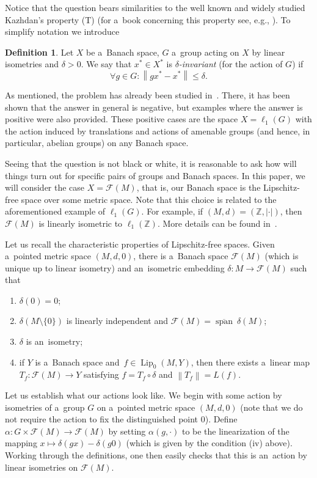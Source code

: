 \documentclass[11pt,a4paper]{amsart}
\theoremstyle{definition}
\newtheorem{definition}[theorem]{Definition}
\newcommand{\Z}{\mathbb{Z}}
\newcommand{\F}{\mathcal{F}}
\newcommand{\lo}{\operatorname{span}}
\newcommand{\abs}[1]{\left| #1 \right|}
\newcommand{\norm}[1]{\left\| #1 \right\|}
\newcommand{\Lipz}{\operatorname{Lip}_0}
\begin{document}
	Notice that the question bears similarities to the well known and widely studied Kazhdan's property (T) (for a~book concerning this property see, e.g., \cite{BHV08}). To simplify notation we introduce
	\begin{definition}
		Let $X$ be a~Banach space, $G$ a~group acting on $X$ by linear isometries and $\delta > 0$. We say that $x^* \in X^*$ is \emph{$\delta$-invariant} (for the action of $G$) if
		\begin{equation*}
			\forall g \in G \colon \norm{gx^* - x^*} \leq \delta.
		\end{equation*}
	\end{definition}
	
	As mentioned, the problem has already been studied in~\cite{Glasner22}. There, it has been shown that the answer in general is negative, but examples where the answer is positive were also provided. These positive cases are the space $X = \ell_1(G)$ with the action induced by translations and actions of amenable groups (and hence, in particular, abelian groups) on any Banach space.
	
	Seeing that the question is not black or white, it is reasonable to ask how will things turn out for specific pairs of groups and Banach spaces. In this paper, we will consider the case $X = \F(M)$, that is, our Banach space is the Lipschitz-free space over some metric space. Note that this choice is related to the aforementioned example of $\ell_1(G)$. For example, if $(M, d) = (\Z, \abs{\cdot})$, then $\F(M)$ is linearly isometric to $\ell_1(\Z)$. More details can be found in~\cite{WeaverLA}.
	
	Let us recall the characteristic properties of Lipschitz-free spaces. Given a~pointed metric space $(M, d, 0)$, there is a~Banach space $\F(M)$ (which is unique up to linear isometry) and an~isometric embedding $\delta: M \to \F(M)$ such that
	\begin{enumerate}
		\item $\delta(0) = 0$;
		\item $\delta(M \setminus \{0\})$ is linearly independent and $\F(M) = \overline{\lo} \ \delta(M)$;
		\item $\delta$ is an~isometry;
		\item if $Y$ is a~Banach space and~$f \in \Lipz(M, Y)$, then there exists a~linear map $T_f: \F(M) \to Y$ satisfying $f = T_f \circ \delta$ and $\norm{T_f} = L(f)$.
	\end{enumerate}
	
	Let us establish what our actions look like. We begin with some action by isometries of a~group $G$ on a~pointed metric space $(M, d, 0)$ (note that we do not require the action to fix the distinguished point $0$). Define $\alpha: G \times \F(M) \to \F(M)$ by setting $\alpha(g, \cdot)$ to be the linearization of the mapping $x \mapsto \delta(gx) - \delta(g0)$ (which is given by the condition (iv) above). Working through the definitions, one then easily checks that this is an~action by linear isometries on $\F(M)$.
	
\end{document}
